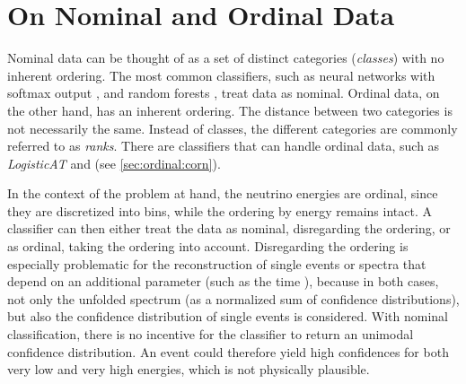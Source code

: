 \section{On Nominal and Ordinal Data}
Nominal data can be thought of as a set of distinct categories
  (\emph{classes})
with no inherent ordering.
The most common classifiers,
  such as
    neural networks with softmax output \cite{dsea_samuel},
    and random forests \cite{hymon2021seasonal},
treat data as nominal.
%
Ordinal data, on the other hand,
has an inherent ordering.
The distance between two categories is not necessarily the same. %
Instead of classes,
  the different categories are commonly referred to as \emph{ranks}.
There are classifiers that can handle ordinal data,
such as
  \emph{LogisticAT} \cite{logisticat, dsea_jan}
  and \corn{} (see \autoref{sec:ordinal:corn}).

In the context of the problem at hand,
  the neutrino energies are ordinal,
    since they are discretized into bins,
      while the ordering by energy remains intact.
%
A classifier can then either
  treat the data as nominal,
    disregarding the ordering,
  or as ordinal,
    taking the ordering into account.
Disregarding the ordering
is especially problematic for the reconstruction of
  single events
  or spectra that depend on an additional parameter
    (such as the time \cite{hymon2021seasonal}),
because in both cases,
  not only the unfolded spectrum
    (as a normalized sum of confidence distributions),
  but also the confidence distribution of single events
  is considered.
With nominal classification,
  there is no incentive for the classifier
    to return an unimodal confidence distribution.
An event could therefore yield
  high confidences for both very low and very high energies,
  which is not physically plausible.


